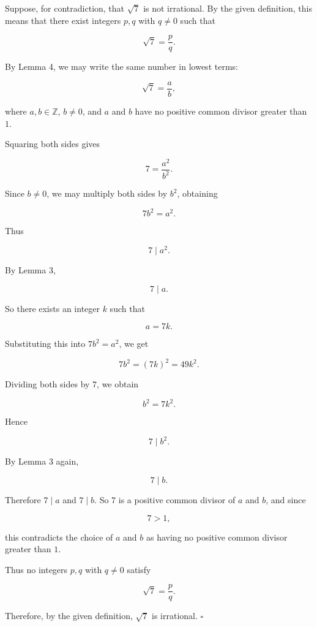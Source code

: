 Suppose, for contradiction, that \(\sqrt 7\) is not irrational. By the given definition, this means that there exist integers \(p,q\) with \(q\neq 0\) such that

\[
\sqrt 7=\frac{p}{q}.
\]

By Lemma 4, we may write the same number in lowest terms:

\[
\sqrt 7=\frac{a}{b},
\]

where \(a,b\in\mathbb Z\), \(b\neq 0\), and \(a\) and \(b\) have no positive common divisor greater than \(1\).

Squaring both sides gives

\[
7=\frac{a^2}{b^2}.
\]

Since \(b\neq 0\), we may multiply both sides by \(b^2\), obtaining

\[
7b^2=a^2.
\]

Thus

\[
7\mid a^2.
\]

By Lemma 3,

\[
7\mid a.
\]

So there exists an integer \(k\) such that

\[
a=7k.
\]

Substituting this into \(7b^2=a^2\), we get

\[
7b^2=(7k)^2=49k^2.
\]

Dividing both sides by \(7\), we obtain

\[
b^2=7k^2.
\]

Hence

\[
7\mid b^2.
\]

By Lemma 3 again,

\[
7\mid b.
\]

Therefore \(7\mid a\) and \(7\mid b\). So \(7\) is a positive common divisor of \(a\) and \(b\), and since

\[
7>1,
\]

this contradicts the choice of \(a\) and \(b\) as having no positive common divisor greater than \(1\).

Thus no integers \(p,q\) with \(q\neq 0\) satisfy

\[
\sqrt 7=\frac{p}{q}.
\]

Therefore, by the given definition, \(\sqrt 7\) is irrational. \(\square\)
